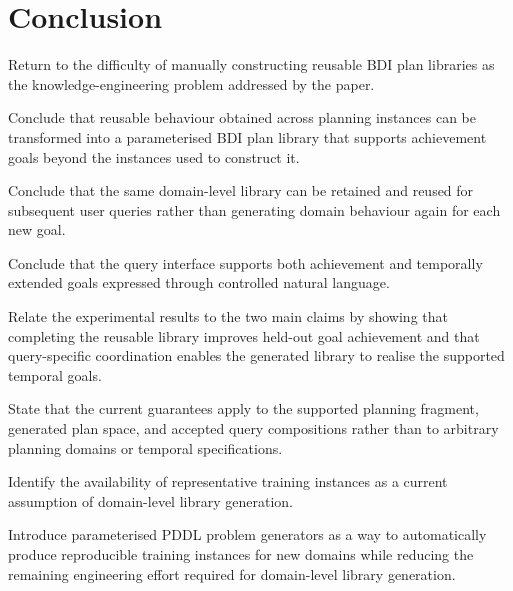 \section{Conclusion}

Return to the difficulty of manually constructing reusable BDI plan
libraries as the knowledge-engineering problem addressed by the paper.

Conclude that reusable behaviour obtained across planning instances can
be transformed into a parameterised BDI plan library that supports
achievement goals beyond the instances used to construct it.

Conclude that the same domain-level library can be retained and reused
for subsequent user queries rather than generating domain behaviour
again for each new goal.

Conclude that the query interface supports both achievement and
temporally extended goals expressed through controlled natural language.

Relate the experimental results to the two main claims by showing that
completing the reusable library improves held-out goal achievement and
that query-specific coordination enables the generated library to
realise the supported temporal goals.

State that the current guarantees apply to the supported planning
fragment, generated plan space, and accepted query compositions rather
than to arbitrary planning domains or temporal specifications.

Identify the availability of representative training instances as a
current assumption of domain-level library generation.

Introduce parameterised PDDL problem generators as a way to
automatically produce reproducible training instances for new domains
while reducing the remaining engineering effort required for
domain-level library generation.
